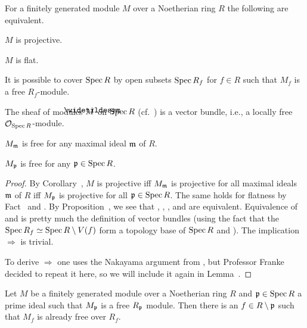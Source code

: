 \documentclass[a4paper,parskip=half,numbers=enddot, DIV=12]{scrreprt}
\begin{document}
\begin{prop}
	For a finitely generated module $M$ over a Noetherian ring $R$ the following are equivalent.
	\begin{alphanumerate}
		\item $M$ is projective.
		\item $M$ is flat.
		\item It is possible to cover $\operatorname{Spec} R$ by open subsets $\operatorname{Spec} R_{f}$ for $f\in R$ such that $M_f$ is a free $R_f$-module.
		\item The sheaf of modules $\snake{M}$ on $\operatorname{Spec} R$ (cf.\ \cite[Definition~1.4.1]{alggeo1}) is a vector bundle, i.e., a locally free $\mathcal{O}_{\operatorname{Spec} R}$-module.
		\item $M_{\mathfrak{m}}$ is free for any maximal ideal $\mathfrak{m}$ of $R$.
		\item $M_{\mathfrak{p}}$ is free for any $\mathfrak{p}\in\operatorname{Spec} R$.
	\end{alphanumerate}
\end{prop}
\begin{proof}
	By Corollary~, $M$ is projective iff $M_{\mathfrak{m}}$ is projective for all maximal ideals $\mathfrak{m}$ of $R$ iff $M_{\mathfrak{p}}$ is projective for all $\mathfrak{p}\in\operatorname{Spec} R$. The same holds for flatness by Fact~ and . By Proposition~, we see that , , , and  are equivalent. Equivalence of  and  is pretty much the definition of vector bundles (using the fact that the $\operatorname{Spec} R_f\simeq \operatorname{Spec} R\setminus V(f)$ form a topology base of $\operatorname{Spec} R$ and \cite[Proposition~1.4.1]{alggeo1}). The implication  $\Rightarrow$  is trivial. 
	
	To derive  $\Rightarrow$  one uses the Nakayama argument from \cite[Corollary~1.5.1]{alg2}, but Professor Franke decided to repeat it here, so we will include it again in Lemma~.
\end{proof}
\begin{lem}
	Let $M$ be a finitely generated module over a Noetherian ring $R$ and $\mathfrak{p}\in\operatorname{Spec} R$ a prime ideal such that $M_{\mathfrak{p}}$ is a free $R_{\mathfrak{p}}$ module. Then there is an $f\in R\setminus\mathfrak{p}$ such that $M_f$ is already free over $R_f$.
\end{lem}
\end{document}
